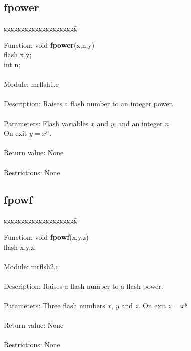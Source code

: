 \subsection{fpower}

\begin{tabbing}
ggggggggggggggggggggg\= \kill

      Function:      \>void {\bf fpower}(x,n,y) \\
                     \>flash x,y; \\
                     \>int n; \\
      \ \\
      Module:        \>mrflsh1.c \\
      \ \\
      Description:   \>Raises a flash number to an integer power. \\
      \ \\
      Parameters:    \>Flash variables $x$ and $y$, and an integer $n$. \\
                     \>On exit $y=x^n$. \\
      \ \\
      Return value:  \>None \\
      \ \\
      Restrictions:  \>None \\
      
\end{tabbing}

\pagebreak
\subsection{fpowf}

\begin{tabbing}
ggggggggggggggggggggg\= \kill

      Function:      \>void {\bf fpowf}(x,y,z) \\
                     \>flash x,y,z; \\
      \ \\
      Module:        \>mrflsh2.c \\
      \ \\
      Description:   \>Raises a flash number to a flash power. \\
      \ \\
      Parameters:    \>Three flash numbers $x$, $y$ and $z$. On exit $z=x^y$ \\
      \ \\
      Return value:  \>None \\
      \ \\
      Restrictions:  \>None \\

\end{tabbing}


